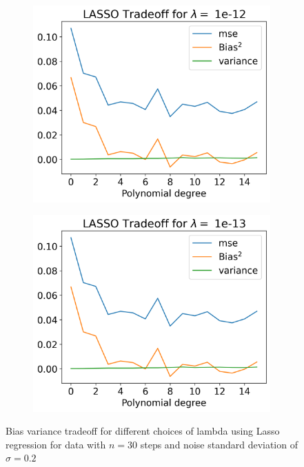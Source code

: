 \documentclass[12pt]{article}
\begin{document}
\begin{figure}[H]
\begin{subfigure}{.5\textwidth}
    \centering
    \includegraphics[width=\textwidth]{../figures/tradeoff_LASSO_1e-12.png}
    \caption{}
    \label{fig:l_1e-12}
  \end{subfigure}
  \begin{subfigure}{.5\textwidth}
    \centering
    \includegraphics[width=\textwidth]{../figures/tradeoff_LASSO_1e-13.png}
    \caption{}
    \label{fig:l_1e-13}
  \end{subfigure}
  \caption{Bias variance tradeoff for different choices of lambda using Lasso regression for data with $n=30$ steps and noise standard deviation of $\sigma=0.2$}
  \label{fig:lasso_tradeoff}
\end{figure}
\end{document}
